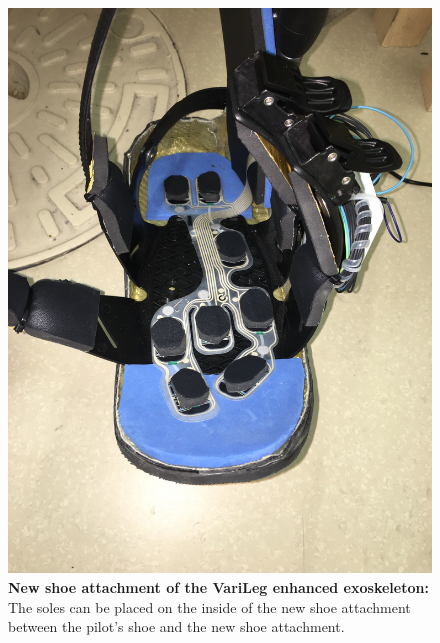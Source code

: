 
\begin{figure}[!t]
	\centering
	\includegraphics[width=1\columnwidth]{Appendix/haptic_feedback/Aussensohle.JPG}
	\caption{\textbf{New shoe attachment of the VariLeg enhanced exoskeleton:} The soles can be placed on the inside of the new shoe attachment between the pilot's shoe and the new shoe attachment.}
	\label{fig: new shoe attachment}
\end{figure}


